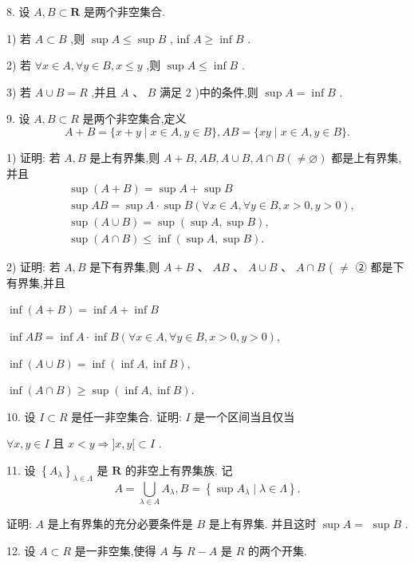 8. 设 $A,B \subset  \mathbf{R}$ 是两个非空集合.

1) 若 $A \subset  B$ ,则 $\sup A \leq  \sup B$ , inf $A \geq  \inf B$ .

2) 若 $\forall x \in  A,\forall y \in  B,x \leq  y$ ,则 $\sup A \leq  \inf B$ .

3) 若 $A \cup  B = R$ ,并且 $A\text{ 、 }B$ 满足 2 )中的条件,则 $\sup A = \inf B$ .

9. 设 $A,B \subset  R$ 是两个非空集合,定义
$$A + B = \{ x + y \mid  x \in  A,y \in  B\} ,{AB} = \{ {xy} \mid  x \in  A,y \in  B\} .$$

1) 证明: 若 $A,B$ 是上有界集,则 $A + B,{AB},A \cup  B,A \cap  B\left( { \neq  \varnothing }\right)$ 都是上有界集, 并且
\begin{align*}
	&\sup \left( {A + B}\right)  = \sup A + \sup B\\
	&\sup {AB} = \sup A \cdot  \sup B\left( {\forall x \in  A,\forall y \in  B,x > 0,y > 0}\right) ,\\
	&\sup \left( {A \cup  B}\right)  = \sup \left( {\sup A,\sup B}\right) ,\\
	&\sup \left( {A \cap  B}\right)  \leq  \inf \left( {\sup A,\sup B}\right) .
\end{align*}

2) 证明: 若 $A,B$ 是下有界集,则 $A + B\text{ 、 }{AB}\text{ 、 }A \cup  B\text{ 、 }A \cap  B$ ( $\neq$ ② 都是下有界集,并且

$\inf \left( {A + B}\right)  = \inf A + \inf B$

$\inf {AB} = \inf A \cdot  \inf B\left( {\forall x \in  A,\forall y \in  B,x > 0,y > 0}\right) ,$

$\inf \left( {A \cup  B}\right)  = \inf \left( {\inf A,\inf B}\right) ,$

$\inf \left( {A \cap  B}\right)  \geq  \sup \left( {\inf A,\inf B}\right) .$

10. 设 $I \subset  R$ 是任一非空集合. 证明: $I$ 是一个区间当且仅当

$\forall x,y \in  I$ 且 $x < y \Rightarrow  \rbrack x,y\lbrack  \subset  I$ .

11. 设 ${\left\{  {A}_{\lambda }\right\}  }_{\lambda  \in  \Lambda }$ 是 $\mathbf{R}$ 的非空上有界集族. 记
$$A = \mathop{\bigcup }\limits_{{\lambda  \in  A}}{A}_{\lambda },B = \left\{  {\sup {A}_{\lambda } \mid  \lambda  \in  \Lambda }\right\}  .$$

证明: $A$ 是上有界集的充分必要条件是 $B$ 是上有界集. 并且这时 $\sup A =$  $\sup B$ .

12. 设 $A \subset  R$ 是一非空集,使得 $A$ 与 $R - A$ 是 $R$ 的两个开集.

